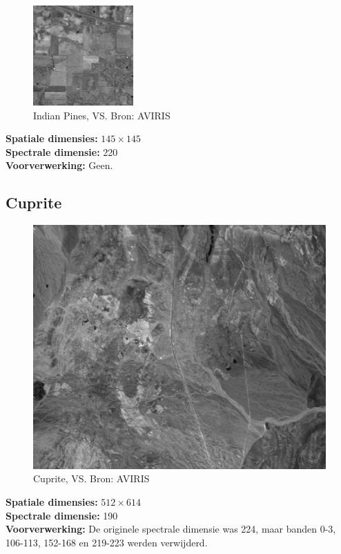 \begin{figure}[H]
  \centering
  \includegraphics[scale=1]{images/indian_pines_sum.png}
  \caption{Indian Pines, VS. Bron: AVIRIS \cite{ref:ehu_aviris_indian_pines}}
  \label{fig:indian_pines_sum}
\end{figure}

\textbf{Spatiale dimensies:} $145 \times 145$\\
\textbf{Spectrale dimensie:} 220\\
\textbf{Voorverwerking:} Geen.

\newpage
\subsection{Cuprite}

\begin{figure}[H]
  \centering
  \includegraphics[scale=0.5]{images/cuprite_sum.png}
  \caption{Cuprite, VS. Bron: AVIRIS \cite{ref:ehu_aviris_cuprite}}
  \label{fig:cuprite_sum}
\end{figure}

\textbf{Spatiale dimensies:} $512 \times 614$\\
\textbf{Spectrale dimensie:} 190\\
\textbf{Voorverwerking:} De originele spectrale dimensie was 224, maar banden 0-3, 106-113, 152-168 en 219-223 werden verwijderd.

